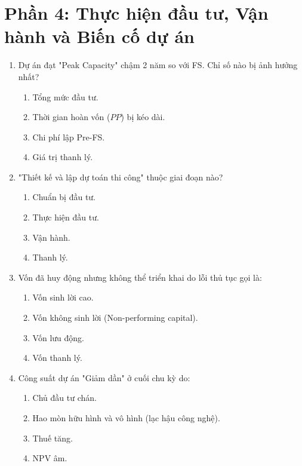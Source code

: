 \section{Phần 4: Thực hiện đầu tư, Vận hành và Biến cố dự án}

\begin{enumerate}[label=\textbf{Câu \arabic*:}, leftmargin=*, resume]

\item Dự án đạt "Peak Capacity" chậm 2 năm so với FS. Chỉ số nào bị ảnh hưởng nhất?
\begin{enumerate}[label=\Alph*.]
    \item Tổng mức đầu tư.
    \item Thời gian hoàn vốn ($PP$) bị kéo dài.
    \item Chi phí lập Pre-FS.
    \item Giá trị thanh lý.
\end{enumerate}

\item "Thiết kế và lập dự toán thi công" thuộc giai đoạn nào?
\begin{enumerate}[label=\Alph*.]
    \item Chuẩn bị đầu tư.
    \item Thực hiện đầu tư.
    \item Vận hành.
    \item Thanh lý.
\end{enumerate}

\item Vốn đã huy động nhưng không thể triển khai do lỗi thủ tục gọi là:
\begin{enumerate}[label=\Alph*.]
    \item Vốn sinh lời cao.
    \item Vốn không sinh lời (Non-performing capital).
    \item Vốn lưu động.
    \item Vốn thanh lý.
\end{enumerate}

\item Công suất dự án "Giảm dần" ở cuối chu kỳ do:
\begin{enumerate}[label=\Alph*.]
    \item Chủ đầu tư chán.
    \item Hao mòn hữu hình và vô hình (lạc hậu công nghệ).
    \item Thuế tăng.
    \item NPV âm.
\end{enumerate}


\end{enumerate}
